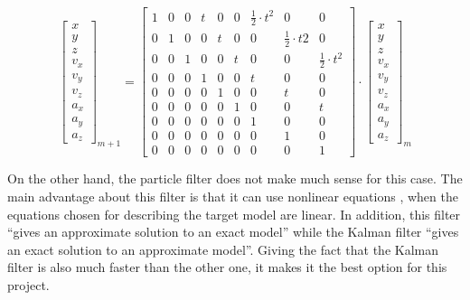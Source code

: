 \begin{equation}
\begin{bmatrix}
x \\ y \\ z \\ v_{x} \\ v_{y} \\ v_{z} \\ a_{x} \\ a_{y} \\ a_{z}
\end{bmatrix}_{m+1}
=
\begin{bmatrix}
1 & 0 & 0 & t & 0 & 0 & \frac{1}{2} \cdot t^{2} & 0 & 0 \\
0 & 1 & 0 & 0 & t & 0 & 0 & \frac{1}{2} \cdot t{2} & 0 \\
0 & 0 & 1 & 0 & 0 & t & 0 & 0 & \frac{1}{2} \cdot t^{2}	\\
0 & 0 & 0 & 1 & 0 & 0 & t & 0 & 0 \\
0 & 0 & 0 & 0 & 1 & 0 & 0 & t & 0 \\
0 & 0 & 0 & 0 & 0 & 1 & 0 & 0 & t \\
0 & 0 & 0 & 0 & 0 & 0 & 1 & 0 & 0 \\
0 & 0 & 0 & 0 & 0 & 0 & 0 & 1 & 0 \\
0 & 0 & 0 & 0 & 0 & 0 & 0 & 0 & 1
\end{bmatrix}
\cdot
\begin{bmatrix}
x \\ y \\ z \\ v_{x} \\ v_{y} \\ v_{z} \\ a_{x} \\ a_{y} \\ a_{z}
\end{bmatrix}_{m}
\label{eq:motion_mat}
\end{equation}

On the other hand, the particle filter does not make much sense for this case. The main advantage about this filter is that it can use nonlinear equations \cite{kalman_lectures}, when the equations chosen for describing the target model are linear.
In addition, this filter ``gives an approximate solution to an exact model'' while the Kalman filter ``gives an exact solution to an approximate model''.
Giving the fact that the Kalman filter is also much faster than the other one, it makes it the best option for this project.

